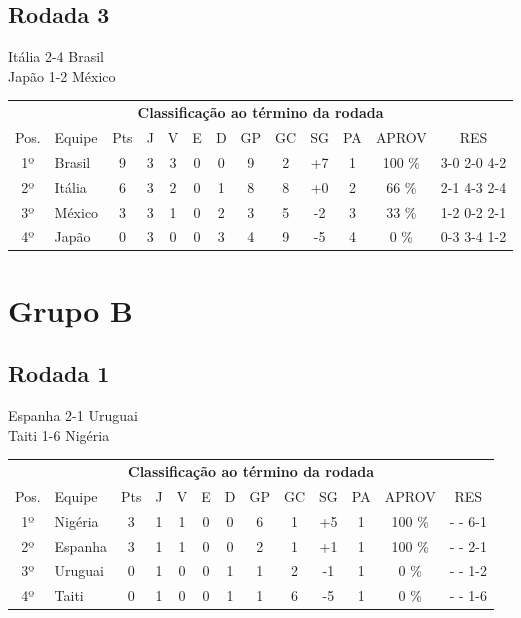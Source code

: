 \documentclass{article}
\begin{document}
\subsection*{Rodada 3}
Itália 2-4 Brasil\\
Japão 1-2 México\\
\begin{center}
\begin{tabular}{| c | l | c | c | c | c | c | c | c | c | c | c | c |}
\multicolumn{13}{c}{\textbf{Classificação ao término da rodada}}\\
Pos.&Equipe&Pts&J&V&E&D&GP&GC&SG&PA&APROV&RES\\
1º&Brasil              &9&3	&3&0&0	&9&2&+7	&1&100 \%	&3-0 2-0 4-2 \\
2º&Itália              &6&3	&2&0&1	&8&8&+0	&2& 66 \%	&2-1 4-3 2-4 \\
3º&México              &3&3	&1&0&2	&3&5&-2	&3& 33 \%	&1-2 0-2 2-1 \\
4º&Japão               &0&3	&0&0&3	&4&9&-5	&4&  0 \%	&0-3 3-4 1-2 \\
\end{tabular}
\end{center}


\section*{Grupo B}
\subsection*{Rodada 1}
Espanha 2-1 Uruguai\\
Taiti 1-6 Nigéria\\
\begin{center}
\begin{tabular}{| c | l | c | c | c | c | c | c | c | c | c | c | c |}
\multicolumn{13}{c}{\textbf{Classificação ao término da rodada}}\\
Pos.&Equipe&Pts&J&V&E&D&GP&GC&SG&PA&APROV&RES\\
1º&Nigéria             &3&1	&1&0&0	&6&1&+5	&1&100 \%	& -  - 6-1 \\
2º&Espanha             &3&1	&1&0&0	&2&1&+1	&1&100 \%	& -  - 2-1 \\
3º&Uruguai             &0&1	&0&0&1	&1&2&-1	&1&  0 \%	& -  - 1-2 \\
4º&Taiti               &0&1	&0&0&1	&1&6&-5	&1&  0 \%	& -  - 1-6 \\
\end{tabular}
\end{center}
\end{document}
